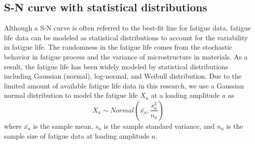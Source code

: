 \subsection{S-N curve with statistical distributions}
Although a S-N curve is often referred to the best-fit line for fatigue data, fatigue life data can be modeled as statistical distributions to account for the variability in fatigue life. The randomness in the fatigue life comes from the stochastic behavior in fatigue process and the variance of microstructure in materials. As a result, the fatigue life has been widely modeled by statistical distributions including Gaussian (normal), log-normal, and Weibull distribution. Due to the limited amount of available fatigue life data in this research, we use a Gaussian normal distribution to model the fatigue life $X_a$ at a loading amplitude $a$ as
\begin{equation}
    X_a \sim Normal(\bar{x_a}, \frac{s_a^2}{n_a})
\end{equation}
where $\bar{x_a}$ is the sample mean, $s_a$ is the sample standard variance, and $n_a$ is the sample size of fatigue data at loading amplitude $a$.

